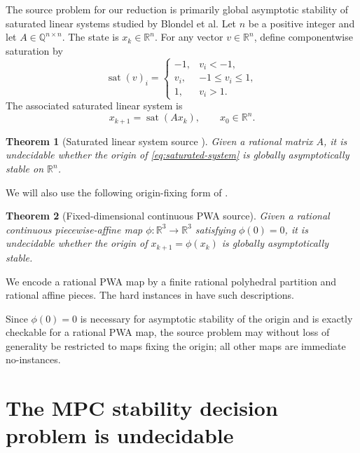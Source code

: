 \documentclass{IEEEtran}
\newtheorem{theorem}{Theorem}
\theoremstyle{remark}
\newcommand{\R}{\mathbb{R}}
\newcommand{\Q}{\mathbb{Q}}
\newcommand{\sat}{\operatorname{sat}}
\begin{document}
The source problem for our reduction is primarily global asymptotic stability of saturated linear systems studied by Blondel et al.  Let $n$ be a positive integer and let $A\in\Q^{n\times n}$.  The state is $x_k\in\R^n$.  For any vector $v\in\R^n$, define componentwise saturation by
\[
  \sat(v)_i =
  \begin{cases}
    -1, & v_i<-1,\\
    v_i, & -1\le v_i\le 1,\\
    1, & v_i>1.
  \end{cases}
\]
The associated saturated linear system is
\begin{equation}
    x_{k+1}=\sat(Ax_k),
    \qquad x_0\in\R^n.
    \label{eq:saturated-system}
\end{equation}

\begin{theorem}[Saturated linear system source \cite{BlondelEtAl2001}]
\label{thm:saturated-source}
Given a rational matrix $A$, it is undecidable whether the origin of \eqref{eq:saturated-system} is globally asymptotically stable on $\R^n$.
\end{theorem}

We will also use the following origin-fixing form of
\cite[Theorem~7.1]{BlondelEtAl2001}.

\begin{theorem}[Fixed-dimensional continuous PWA source]
\label{thm:fixed-pwa-source}
Given a rational continuous piecewise-affine map
$\phi:\R^3\to\R^3$ satisfying $\phi(0)=0$, it is undecidable whether the
origin of $x_{k+1}=\phi(x_k)$ is globally asymptotically stable.
\end{theorem}

We encode a rational PWA map by a finite rational polyhedral partition and
rational affine pieces.  The hard instances in
\cite[Theorem~7.1]{BlondelEtAl2001} have such descriptions.

Since $\phi(0)=0$ is necessary for asymptotic stability of the origin and is
exactly checkable for a rational PWA map, the source problem may without loss
of generality be restricted to maps fixing the origin; all other maps are
immediate no-instances.


\section{The MPC stability decision problem is undecidable}
\end{document}
